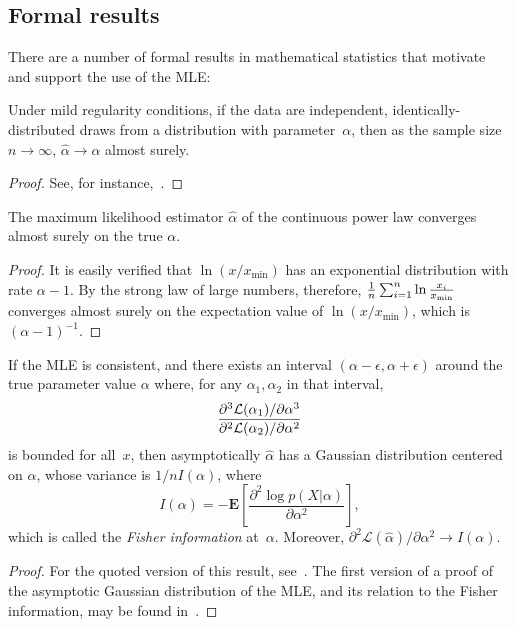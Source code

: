 \documentclass[final]{siamltex}
\newcommand{\Expect}[1]{\ensuremath{\mathbf{E}\left[ #1 \right]}}
\newcommand{\xmin}{\ensuremath{x_{\min}}}
\newcommand{\Loglike}{\ensuremath{\mathcal{L}}}
\begin{document}
\begin{appendix}
\subsection{Formal results}
There are a number of formal results in mathematical statistics that
motivate and support the use of the MLE:
\medbreak
\begin{theorem}
 Under mild regularity conditions, if the data are independent,
 identically-distributed draws from a distribution with parameter~$\alpha$,
 then as the sample size $n\to\infty$, $\hat{\alpha}\to\alpha$ almost surely.
\label{theorem:consistency-of-mle}
\end{theorem}
\begin{proof}
See, for instance,~\cite{Pitman-basic-theory}.
\end{proof}

\medbreak
\begin{proposition}
 The maximum likelihood estimator $\hat{\alpha}$ of the continuous power
 law converges almost surely on the true $\alpha$.
 \label{prop:consistency-of-mle}
\end{proposition}
\begin{proof}
 It is easily verified that $\ln(x/\xmin)$ has an exponential distribution
 with rate $\alpha-1$.  By the strong law of large numbers, therefore,
 $\frac{1}{n}\sum_{i=1}^{n}{\ln{x_i \over \xmin}}$ converges almost surely
 on the expectation value of $\ln(x/\xmin)$, which is ${(\alpha -
   1)}^{-1}$.
\end{proof}

\medbreak
\begin{theorem}
 If the MLE is consistent, and there exists an interval $(\alpha -
 \epsilon, \alpha+\epsilon)$ around the true parameter value $\alpha$
 where, for any $\alpha_1, \alpha_2$ in that interval,
\begin{equation}
{\partial^3 \Loglike(\alpha_1)/\partial \alpha^3\over
 \partial^2 \Loglike(\alpha_2)/\partial \alpha^2}
\end{equation}
is bounded for all~$x$, then asymptotically $\hat{\alpha}$ has a Gaussian
distribution centered on $\alpha$, whose variance is $1/nI(\alpha)$, where
\begin{equation}
I(\alpha) = -\Expect{\frac{\partial^2 \log{p(X|\alpha)}}{\partial
   \alpha^2}},
\end{equation}
which is called the \emph{Fisher information} at~$\alpha$.  Moreover,
$\partial^2 \Loglike(\hat{\alpha})/\partial \alpha^2 \to I(\alpha)$.
\label{theorem:asymptotic-dist-of-mle}
\end{theorem}
\begin{proof}
 For the quoted version of this result,
 see~\cite[ch.~3]{Barndorff-Nielsen-and-Cox-inference-and-asymptotics}.
 The first version of a proof of the asymptotic Gaussian distribution of
 the MLE, and its relation to the Fisher information, may be found
 in~\cite{Fisher-introduces-maximum-likelihood}.
\end{proof}


\end{appendix}
\end{document}
